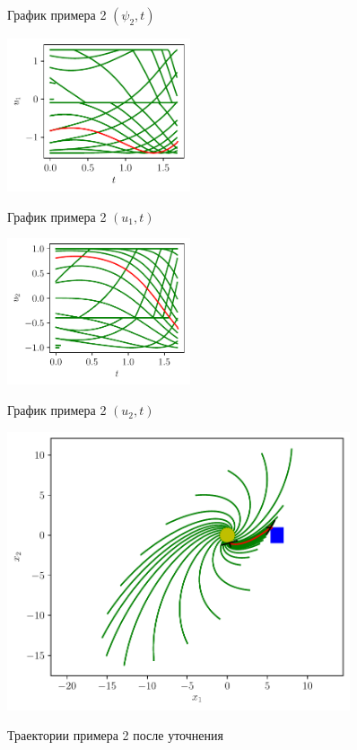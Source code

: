\documentclass[12pt, a4paper]{article} %
\begin{document}
\begin{figure}[H]
\begin{multicols}{2}
\begin{centering}
            \label{fig:ex2_p2t}
            \caption{График примера 2 $(\psi_2, t)$}
        \end{centering} 
    \end{multicols}
    \vfill
    \begin{multicols}{2}
        \begin{centering}
            \includegraphics[width=0.48\textwidth]{figures/ex2_u1t.pdf}
            \label{fig:ex2_u1t}
            \caption{График примера 2 $(u_1, t)$}
            \hfill 
            \includegraphics[width=0.48\textwidth]{figures/ex2_u2t.pdf}
            \label{fig:ex2_u2t}
            \caption{График примера 2 $(u_2, t)$}
        \end{centering} 
    \end{multicols}
\end{figure} 

\begin{figure}[H]
    \centering
    \includegraphics[width=0.9\textwidth]{figures/ex2_x_clar.pdf}
    \label{fig:ex2_clar}
    \caption{Траектории примера 2 после уточнения}
\end{figure} 
\end{document}
